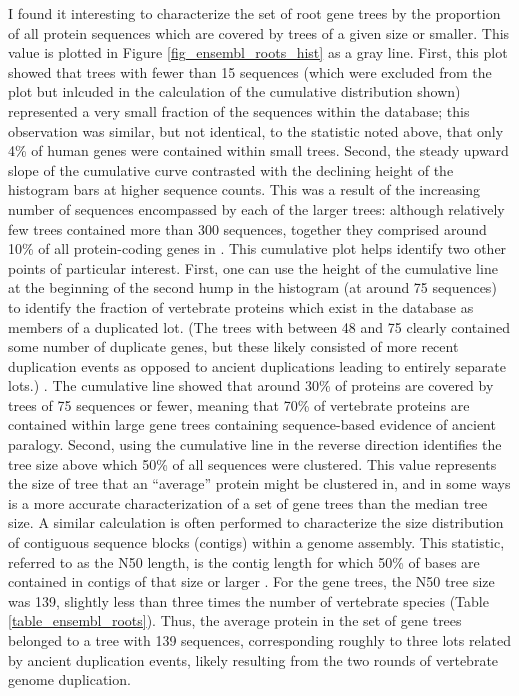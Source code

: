 I found it interesting to characterize the set of root \cmp gene trees
by the proportion of all protein sequences which are covered by trees
of a given size or smaller. This value is plotted in Figure
\ref{fig_ensembl_roots_hist} as a gray line. First, this plot showed that
trees with fewer than 15 sequences (which were excluded from the plot
but inlcuded in the calculation of the cumulative distribution shown)
represented a very small fraction of the sequences within the \cmp
database; this observation was similar, but not identical, to the
statistic noted above, that only 4\% of human genes were contained
within small trees. Second, the steady upward slope of the cumulative
curve contrasted with the declining height of the histogram bars at
higher sequence counts. This was a result of the increasing number of
sequences encompassed by each of the larger trees: although relatively
few trees contained more than 300 sequences, together they comprised
around 10\% of all protein-coding genes in \cmp. This cumulative plot
helps identify two other points of particular interest. First, one can
use the height of the cumulative line at the beginning of the second
hump in the histogram (at around 75 sequences) to identify the
fraction of vertebrate proteins which exist in the \cmp database as
members of a duplicated \mammln \ac{lot}. (The trees with between 48
and 75 clearly contained some number of duplicate genes, but these
likely consisted of more recent duplication events as opposed to
ancient duplications leading to entirely separate \acp{lot}.) . The
cumulative line showed that around 30\% of proteins are covered by
trees of 75 sequences or fewer, meaning that 70\% of vertebrate
proteins are contained within large gene trees containing
sequence-based evidence of ancient paralogy. Second, using the
cumulative line in the reverse direction identifies the tree size
above which 50\% of all sequences were clustered. This value
represents the size of tree that an ``average'' protein might be
clustered in, and in some ways is a more accurate characterization of
a set of gene trees than the median tree size. A similar calculation
is often performed to characterize the size distribution of contiguous
sequence blocks (contigs) within a genome assembly. This statistic,
referred to as the N50 length, is the contig length for which 50\% of
bases are contained in contigs of that size or larger
\citep{Miller2010}. For the \cmp gene trees, the N50 tree size was
139, slightly less than three times the number of vertebrate species
(Table \ref{table_ensembl_roots}). Thus, the average protein in the set
of \cmp gene trees belonged to a tree with 139 sequences,
corresponding roughly to three \mammln \acp{lot} related by ancient
duplication events, likely resulting from the two rounds of vertebrate
genome duplication.

